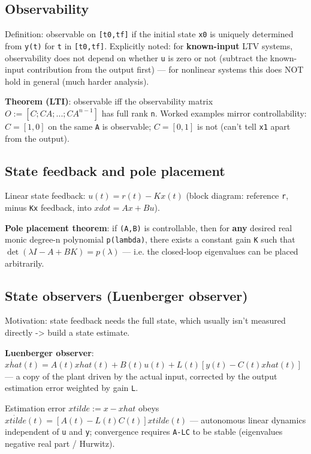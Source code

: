 \documentclass[11pt]{article}
\begin{document}
\subsection{Observability}
Definition: observable on \texttt{[t0,tf]} if the initial state \texttt{x0} is uniquely determined from \texttt{y(t)} for \texttt{t} in \texttt{[t0,tf]}. Explicitly noted: for \textbf{known-input} LTV systems, observability does not depend on whether \texttt{u} is zero or not (subtract the known-input contribution from the output first) — for nonlinear systems this does NOT hold in general (much harder analysis).

\textbf{Theorem (LTI)}: observable iff the observability matrix $O := [C; CA; ...; CA^{n-1}]$ has full rank \texttt{n}.
Worked examples mirror controllability: $C=[1,0]$ on the same \texttt{A} is observable; $C=[0,1]$ is not (can't tell \texttt{x1} apart from the output).

\subsection{State feedback and pole placement}
Linear state feedback: $u(t) = r(t) - K x(t)$ (block diagram: reference \texttt{r}, minus \texttt{Kx} feedback, into $xdot=Ax+Bu$).

\textbf{Pole placement theorem}: if \texttt{(A,B)} is controllable, then for \textbf{any} desired real monic degree-n polynomial \texttt{p(lambda)}, there exists a constant gain \texttt{K} such that $\det(\lambda I - A + BK) = p(\lambda)$ — i.e. the closed-loop eigenvalues can be placed arbitrarily.

\subsection{State observers (Luenberger observer)}
Motivation: state feedback needs the full state, which usually isn't measured directly -> build a state estimate.

\textbf{Luenberger observer}: $\dot{xhat}(t) = A(t)xhat(t) + B(t)u(t) + L(t)[y(t) - C(t)xhat(t)]$ — a copy of the plant driven by the actual input, corrected by the output estimation error weighted by gain \texttt{L}.

Estimation error $xtilde := x - xhat$ obeys $\dot{xtilde}(t) = [A(t) - L(t)C(t)] xtilde(t)$ — autonomous linear dynamics independent of \texttt{u} and \texttt{y}; convergence requires \texttt{A-LC} to be stable (eigenvalues negative real part / Hurwitz).
\end{document}
